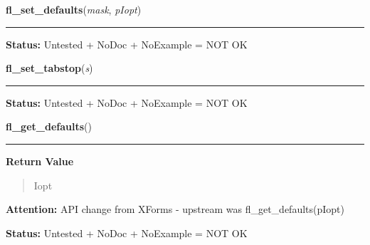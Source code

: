     \vspace{0.5ex}

\hspace{.8\funcindent}\begin{boxedminipage}{\funcwidth}

    \raggedright \textbf{fl\_set\_defaults}(\textit{mask}, \textit{pIopt})

    \vspace{-1.5ex}

    \rule{\textwidth}{0.5\fboxrule}
\setlength{\parskip}{2ex}
\setlength{\parskip}{1ex}
\textbf{Status:} Untested + NoDoc + NoExample = NOT OK



    \end{boxedminipage}

    \label{xformslib:library:fl_set_tabstop}

    \vspace{0.5ex}

\hspace{.8\funcindent}\begin{boxedminipage}{\funcwidth}

    \raggedright \textbf{fl\_set\_tabstop}(\textit{s})

    \vspace{-1.5ex}

    \rule{\textwidth}{0.5\fboxrule}
\setlength{\parskip}{2ex}
\setlength{\parskip}{1ex}
\textbf{Status:} Untested + NoDoc + NoExample = NOT OK



    \end{boxedminipage}

    \label{xformslib:library:fl_get_defaults}

    \vspace{0.5ex}

\hspace{.8\funcindent}\begin{boxedminipage}{\funcwidth}

    \raggedright \textbf{fl\_get\_defaults}()

    \vspace{-1.5ex}

    \rule{\textwidth}{0.5\fboxrule}
\setlength{\parskip}{2ex}
\setlength{\parskip}{1ex}
      \textbf{Return Value}
    \vspace{-1ex}

      \begin{quote}
      Iopt

      \end{quote}

\textbf{Attention:} API change from XForms - upstream was fl\_get\_defaults(pIopt)



\textbf{Status:} Untested + NoDoc + NoExample = NOT OK



    \end{boxedminipage}


